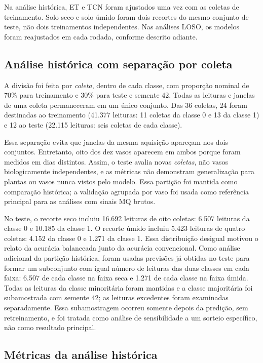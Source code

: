 Na análise histórica, ET e TCN foram ajustados uma vez com as coletas
de treinamento. Solo seco e solo úmido foram dois recortes do mesmo
conjunto de teste, não dois treinamentos independentes. Nas análises
LOSO, os modelos foram reajustados em cada rodada, conforme descrito
adiante.

\subsection{Análise histórica com separação por coleta}
\label{subsec:treinamento_teste}

A divisão foi feita por \emph{coleta}, dentro de cada classe, com
proporção nominal de 70\% para treinamento e 30\% para teste e semente 42.
Todas as leituras e janelas de uma coleta permaneceram em um único conjunto.
Das 36 coletas, 24 foram destinadas ao treinamento (41.377 leituras: 11
coletas da classe 0 e 13 da classe 1) e 12 ao teste (22.115 leituras:
seis coletas de cada classe).

Essa separação evita que janelas da mesma aquisição apareçam nos dois
conjuntos. Entretanto, oito dos dez vasos aparecem em ambos porque foram
medidos em dias distintos. Assim, o teste avalia novas \emph{coletas}, não vasos
biologicamente independentes, e as métricas não demonstram generalização
para plantas ou vasos nunca vistos pelo modelo. Essa partição foi mantida
como comparação histórica; a validação agrupada por vaso foi usada como
referência principal para as análises com sinais MQ brutos.

No teste, o recorte seco incluiu 16.692 leituras de oito coletas: 6.507
leituras da classe 0 e 10.185 da classe 1. O recorte úmido incluiu 5.423
leituras de quatro coletas: 4.152 da classe 0 e 1.271 da classe 1. Essa
distribuição desigual motivou o relato da acurácia balanceada junto da
acurácia convencional. Como análise adicional da partição histórica,
foram usadas previsões já obtidas no teste para formar um subconjunto
com igual número de leituras das duas classes em cada faixa: 6.507 de
cada classe na faixa seca e 1.271 de cada classe na faixa úmida. Todas
as leituras da classe minoritária foram mantidas e a classe majoritária
foi subamostrada com semente 42; as leituras excedentes foram examinadas
separadamente. Essa subamostragem ocorreu somente depois da predição,
sem retreinamento, e foi tratada como análise de sensibilidade a um
sorteio específico, não como resultado principal.

\subsection{Métricas da análise histórica}
\label{subsec:metricas}

